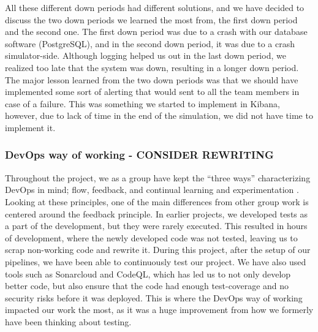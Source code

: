 All these different down periods had different solutions, and we have decided to discuss the two down periods we learned the most from, the first down period and the second one. The first down period was due to a crash with our database software (PostgreSQL), and in the second down period, it was due to a crash simulator-side. Although logging helped us out in the last down period, we realized too late that the system was down, resulting in a longer down period. The major lesson learned from the two down periods was that we should have implemented some sort of alerting that would sent to all the team members in case of a failure. This was something we started to implement in Kibana, however, due to lack of time in the end of the simulation, we did not have time to implement it.

\subsubsection{DevOps way of working - CONSIDER REWRITING}

Throughout the project, we as a group have kept the “three ways” characterizing DevOps in mind; flow, feedback, and continual learning and experimentation \cite{devopshandbook}. Looking at these principles, one of the main differences from other group work is centered around the feedback principle. In earlier projects, we developed tests as a part of the development, but they were rarely executed. This resulted in hours of development, where the newly developed code was not tested, leaving us to scrap non-working code and rewrite it. During this project, after the setup of our pipelines, we have been able to continuously test our project. We have also used tools such as Sonarcloud and CodeQL, which has led us to not only develop better code, but also ensure that the code had enough test-coverage and no security risks before it was deployed. This is where the DevOps way of working impacted our work the most, as it was a huge improvement from how we formerly have been thinking about testing.